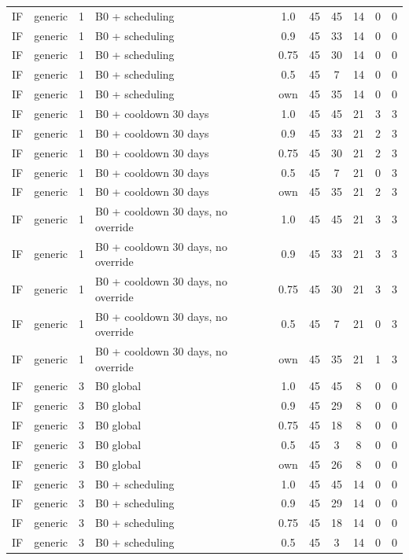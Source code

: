 \begin{longtable}{lllp{4.4cm}cccccc}
IF & generic & 1 & B0 + scheduling & 1.0 & 45 & 45 & 14 & 0 & 0 \\
IF & generic & 1 & B0 + scheduling & 0.9 & 45 & 33 & 14 & 0 & 0 \\
IF & generic & 1 & B0 + scheduling & 0.75 & 45 & 30 & 14 & 0 & 0 \\
IF & generic & 1 & B0 + scheduling & 0.5 & 45 & 7 & 14 & 0 & 0 \\
IF & generic & 1 & B0 + scheduling & own & 45 & 35 & 14 & 0 & 0 \\
IF & generic & 1 & B0 + cooldown 30 days & 1.0 & 45 & 45 & 21 & 3 & 3 \\
IF & generic & 1 & B0 + cooldown 30 days & 0.9 & 45 & 33 & 21 & 2 & 3 \\
IF & generic & 1 & B0 + cooldown 30 days & 0.75 & 45 & 30 & 21 & 2 & 3 \\
IF & generic & 1 & B0 + cooldown 30 days & 0.5 & 45 & 7 & 21 & 0 & 3 \\
IF & generic & 1 & B0 + cooldown 30 days & own & 45 & 35 & 21 & 2 & 3 \\
IF & generic & 1 & B0 + cooldown 30 days, no override & 1.0 & 45 & 45 & 21 & 3 & 3 \\
IF & generic & 1 & B0 + cooldown 30 days, no override & 0.9 & 45 & 33 & 21 & 3 & 3 \\
IF & generic & 1 & B0 + cooldown 30 days, no override & 0.75 & 45 & 30 & 21 & 3 & 3 \\
IF & generic & 1 & B0 + cooldown 30 days, no override & 0.5 & 45 & 7 & 21 & 0 & 3 \\
IF & generic & 1 & B0 + cooldown 30 days, no override & own & 45 & 35 & 21 & 1 & 3 \\
IF & generic & 3 & B0 global & 1.0 & 45 & 45 & 8 & 0 & 0 \\
IF & generic & 3 & B0 global & 0.9 & 45 & 29 & 8 & 0 & 0 \\
IF & generic & 3 & B0 global & 0.75 & 45 & 18 & 8 & 0 & 0 \\
IF & generic & 3 & B0 global & 0.5 & 45 & 3 & 8 & 0 & 0 \\
IF & generic & 3 & B0 global & own & 45 & 26 & 8 & 0 & 0 \\
IF & generic & 3 & B0 + scheduling & 1.0 & 45 & 45 & 14 & 0 & 0 \\
IF & generic & 3 & B0 + scheduling & 0.9 & 45 & 29 & 14 & 0 & 0 \\
IF & generic & 3 & B0 + scheduling & 0.75 & 45 & 18 & 14 & 0 & 0 \\
IF & generic & 3 & B0 + scheduling & 0.5 & 45 & 3 & 14 & 0 & 0 \\

\end{longtable}
